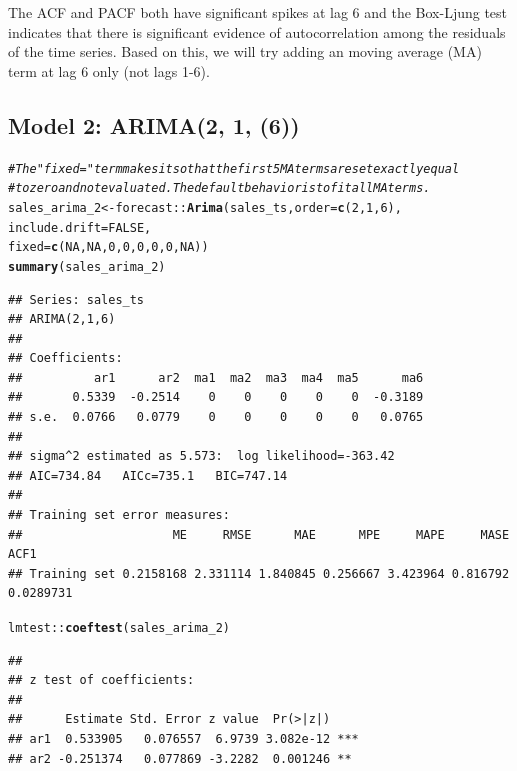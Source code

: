 \documentclass{article}\usepackage[]{graphicx}\usepackage[]{color}
\makeatletter
\newcommand{\hlnum}[1]{\textcolor[rgb]{0.686,0.059,0.569}{#1}}%
\newcommand{\hlcom}[1]{\textcolor[rgb]{0.678,0.584,0.686}{\textit{#1}}}%
\newcommand{\hlopt}[1]{\textcolor[rgb]{0,0,0}{#1}}%
\newcommand{\hlstd}[1]{\textcolor[rgb]{0.345,0.345,0.345}{#1}}%
\newcommand{\hlkwb}[1]{\textcolor[rgb]{0.69,0.353,0.396}{#1}}%
\newcommand{\hlkwc}[1]{\textcolor[rgb]{0.333,0.667,0.333}{#1}}%
\newcommand{\hlkwd}[1]{\textcolor[rgb]{0.737,0.353,0.396}{\textbf{#1}}}%
\newenvironment{kframe}{%
 \def\at@end@of@kframe{}%
 \ifinner\ifhmode%
  \def\at@end@of@kframe{\end{minipage}}%
  \begin{minipage}{\columnwidth}%
 \fi\fi%
 \def\FrameCommand##1{\hskip\@totalleftmargin \hskip-\fboxsep
 \colorbox{shadecolor}{##1}\hskip-\fboxsep
     \hskip-\linewidth \hskip-\@totalleftmargin \hskip\columnwidth}%
 \MakeFramed {\advance\hsize-\width
   \@totalleftmargin\z@ \linewidth\hsize
   \@setminipage}}%
 {\par\unskip\endMakeFramed%
 \at@end@of@kframe}
\newenvironment{knitrout}{}{} %
\makeatother
\begin{document}
The ACF and PACF both have significant spikes at lag 6 and the Box-Ljung test indicates that there is significant evidence of autocorrelation among the residuals of the time series. Based on this, we will try adding an moving average (MA) term at lag 6 only (not lags 1-6). 

\subsection*{Model 2: ARIMA(2, 1, (6))}

\begin{knitrout}
\color{fgcolor}\begin{kframe}
\begin{alltt}
\hlcom{# The "fixed = " term makes it so that the first 5 MA terms are set exactly equal }
\hlcom{# to zero and not evaluated. The default behavior is to fit all MA terms. }
\hlstd{sales_arima_2} \hlkwb{<-} \hlstd{forecast}\hlopt{::}\hlkwd{Arima}\hlstd{(sales_ts,} \hlkwc{order} \hlstd{=} \hlkwd{c}\hlstd{(}\hlnum{2}\hlstd{,} \hlnum{1}\hlstd{,} \hlnum{6}\hlstd{),}
                               \hlkwc{include.drift} \hlstd{=} \hlnum{FALSE}\hlstd{,}
                               \hlkwc{fixed} \hlstd{=} \hlkwd{c}\hlstd{(}\hlnum{NA}\hlstd{,} \hlnum{NA}\hlstd{,} \hlnum{0}\hlstd{,} \hlnum{0}\hlstd{,} \hlnum{0}\hlstd{,} \hlnum{0}\hlstd{,} \hlnum{0}\hlstd{,} \hlnum{NA}\hlstd{))}
\hlkwd{summary}\hlstd{(sales_arima_2)}
\end{alltt}
\begin{verbatim}
## Series: sales_ts 
## ARIMA(2,1,6) 
## 
## Coefficients:
##          ar1      ar2  ma1  ma2  ma3  ma4  ma5      ma6
##       0.5339  -0.2514    0    0    0    0    0  -0.3189
## s.e.  0.0766   0.0779    0    0    0    0    0   0.0765
## 
## sigma^2 estimated as 5.573:  log likelihood=-363.42
## AIC=734.84   AICc=735.1   BIC=747.14
## 
## Training set error measures:
##                     ME     RMSE      MAE      MPE     MAPE     MASE      ACF1
## Training set 0.2158168 2.331114 1.840845 0.256667 3.423964 0.816792 0.0289731
\end{verbatim}
\begin{alltt}
\hlstd{lmtest}\hlopt{::}\hlkwd{coeftest}\hlstd{(sales_arima_2)}
\end{alltt}
\begin{verbatim}
## 
## z test of coefficients:
## 
##      Estimate Std. Error z value  Pr(>|z|)    
## ar1  0.533905   0.076557  6.9739 3.082e-12 ***
## ar2 -0.251374   0.077869 -3.2282  0.001246 ** 

\end{verbatim}
\end{kframe}
\end{knitrout}
\end{document}
